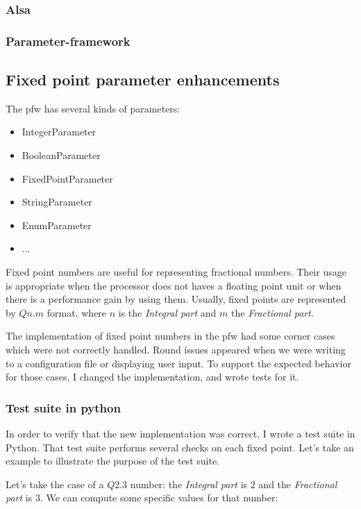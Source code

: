 \subsubsection{Alsa}
\subsubsection{Parameter-framework}

\subsection{Fixed point parameter enhancements}
The \gls{pfw} has several kinds of parameters:
\begin{itemize}
    \item IntegerParameter
    \item BooleanParameter
    \item FixedPointParameter
    \item StringParameter
    \item EnumParameter
    \item ...
\end{itemize}

Fixed point numbers are useful for representing fractional numbers. Their
usage is appropriate when the processor does not haves a floating point unit
or when there is a performance gain by using them. Usually, fixed points are
represented by $Qn.m$ format, where $n$ is the \emph{Integral part} and $m$ the
\emph{Fractional part}.

The implementation of fixed point numbers in the \gls{pfw} had some
corner cases which were not correctly handled. Round issues appeared when we
were writing to a configuration file or displaying user input. To
support the expected behavior for those cases, I changed the implementation, and
wrote tests for it.

\subsubsection{Test suite in python}

In order to verify that the new implementation was correct, I wrote a test suite
in Python. That test suite performs several checks on each fixed point. Let's
take an example to illustrate the purpose of the test suite.

Let's take the case of a $Q2.3$ number: the \emph{Integral part} is $2$ and the
\emph{Fractional part} is $3$. We can compute some specific values for that number:

